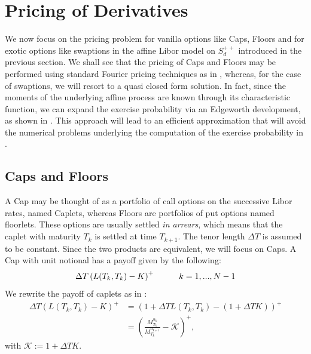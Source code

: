 \section{Pricing of Derivatives}

We now focus on the pricing problem for vanilla options like Caps, Floors and for exotic options like swaptions in the affine Libor model on $S^{++}_d$ introduced in the previous section. We shall see that the pricing of Caps and Floors may be performed using standard Fourier pricing techniques as in \cite{article_KRPT2009}, whereas, for the case of swaptions, we will resort to a quasi closed form solution. In fact, since the moments of the underlying affine process are known through its characteristic function, we can expand the exercise probability via an Edgeworth development, as shown in \cite{article_CollinDufresneGoldstein2002}. This approach will lead to an efficient approximation that will avoid the numerical problems underlying the computation of the exercise probability in  \cite{article_KRPT2009}.


\subsection{Caps and Floors}
A Cap may be thought of as a portfolio of call options on the successive Libor rates, named Caplets, whereas Floors are portfolios of put options named floorlets. These options are usually settled \textit{in arrears}, which means that the caplet with maturity $T_{k}$ is settled at time $T_{k+1}$. The tenor length $\Delta T$ is assumed to be constant. Since the two products are equivalent, we will focus on Caps. A Cap with unit notional has a payoff given by the following:
\begin{equation}
\Delta T \left( L(T_{k},T_{k})-K\right)^{+}\hspace{10mm}k=1,...,N-1
\end{equation}
We rewrite the payoff of caplets as in \cite{article_KRPT2009}:
\begin{align}
\Delta T \left( L(T_{k},T_{k})-K\right)^{+}&= \left(1+ \Delta TL(T_{k},T_{k})-\left(1+\Delta TK\right)\right)^{+}\nonumber\\
&=\left(\frac{M^{u_{k}}_{T_{k}}}{M^{u_{k+1}}_{T_{k}}}-\mathcal{K} \right)^{+},
\end{align}
with $\mathcal{K}:=1+\Delta TK$.


